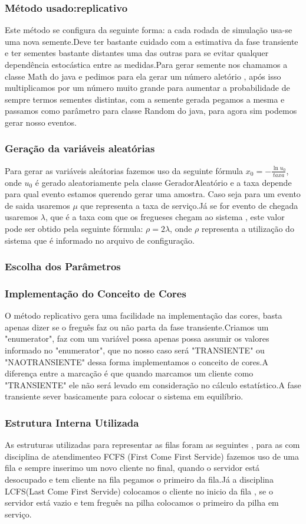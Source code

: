 \documentclass[a4paper,10pt]{article}
\begin{document}
	\subsubsection{Método usado:replicativo}
	Este método se configura da seguinte forma: a cada rodada de simulação usa-se uma nova semente.Deve ter bastante cuidado com a estimativa da fase transiente e ter sementes bastante distantes uma das outras para se evitar qualquer
	dependência estocástica entre as medidas.Para gerar semente nos chamamos a classe Math do java e pedimos para ela gerar um número aletório , após isso multiplicamos por um número muito grande para aumentar a probabilidade de sempre 
	termos sementes distintas, com a semente gerada pegamos a mesma e passamos como parâmetro para classe Random do java, para agora sim podemos gerar nosso eventos.
	\subsubsection{Geração da variáveis aleatórias}
	Para gerar as variáveis aleátorias fazemos uso da seguinte fórmula $x_0 = -\frac{\ln u_0}{taxa}$, onde $u_0$ é gerado aleatoriamente pela classe GeradorAleatório e a taxa depende para qual evento estamos querendo gerar uma amostra.
	Caso seja para um evento de saida usaremos $\mu$ que representa a taxa de serviço.Já se for evento de chegada usaremos $\lambda$, que é a taxa com que os fregueses chegam ao sistema , este valor pode ser obtido pela seguinte fórmula:
	$\rho = 2\lambda$, onde $\rho$ representa a utilização do sistema que é informado no arquivo de configuração.
	\subsubsection{Escolha dos Parâmetros}
	\subsubsection{Implementação do Conceito de Cores}
	O método replicativo gera uma facilidade na implementação das cores, basta apenas dizer se o freguês faz ou não parta da fase transiente.Criamos um "enumerator", faz com um variável possa apenas possa assumir os valores informado no 
	"enumerator", que no nosso caso será "TRANSIENTE" ou "NAOTRANSIENTE" dessa forma implementamos o conceito de cores.A diferença entre a marcação é que quando  marcamos um cliente como "TRANSIENTE" ele não será levado em consideração 
	no cálculo estatístico.A fase transiente sever basicamente para colocar o sistema em equilíbrio.
	\subsubsection{Estrutura Interna Utilizada}
	As estruturas utilizadas para representar as filas foram as seguintes , para as com disciplina de atendimenteo FCFS (First Come First Servide) fazemos uso de uma fila e sempre inserimo um novo cliente no final, quando o servidor está
	desocupado e tem cliente na fila pegamos o primeiro da fila.Já a disciplina LCFS(Last Come First Servide) colocamos o cliente no inicio da fila , se o servidor está vazio e tem freguês na pilha colocamos o primeiro da pilha em serviço.
\end{document}
